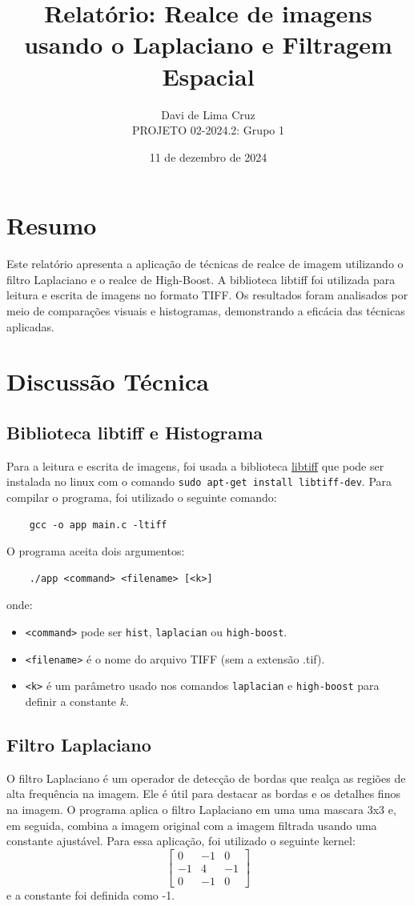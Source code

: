 \documentclass{article}
\author{Davi de Lima Cruz\\  PROJETO 02-2024.2: Grupo 1}
\title{Relatório: Realce de imagens usando o Laplaciano e Filtragem Espacial}
\date{11 de dezembro de 2024}
\begin{document}
\maketitle

\vfill
\section*{Resumo}
Este relatório apresenta a aplicação de técnicas de realce de imagem utilizando o filtro Laplaciano e o realce de High-Boost. A biblioteca libtiff foi utilizada para leitura e escrita de imagens no formato TIFF. Os resultados foram analisados por meio de comparações visuais e histogramas, demonstrando a eficácia das técnicas aplicadas.
\newpage
\section{Discussão Técnica}
\subsection{Biblioteca libtiff e Histograma}
Para a leitura e escrita de imagens, foi usada a biblioteca \href{http://www.simplesystems.org/libtiff/}{libtiff} que pode ser instalada no linux com o comando \texttt{sudo apt-get install libtiff-dev}. 
Para compilar o programa, foi utilizado o seguinte comando:
\begin{lstlisting}
    gcc -o app main.c -ltiff
\end{lstlisting}
O programa aceita dois argumentos: 
\begin{lstlisting}
    ./app <command> <filename> [<k>]
\end{lstlisting}
onde:
\begin{itemize}
    \item \texttt{<command>} pode ser \texttt{hist}, \texttt{laplacian} ou \texttt{high-boost}.
    \item \texttt{<filename>} é o nome do arquivo TIFF (sem a extensão .tif).
    \item \texttt{<k>} é um parâmetro usado nos comandos \texttt{laplacian} e \texttt{high-boost} para definir a constante $k$.
\end{itemize}

\subsection{Filtro Laplaciano}
O filtro Laplaciano é um operador de detecção de bordas que realça as regiões de alta frequência na imagem. Ele é útil para destacar as bordas e os detalhes finos na imagem. O programa aplica o filtro Laplaciano em uma uma mascara 3x3 e, em seguida, combina a imagem original com a imagem filtrada usando uma constante ajustável.
Para essa aplicação, foi utilizado o seguinte kernel:
\[
\begin{bmatrix}
0 & -1 & 0 \\
-1 & 4 & -1 \\
0 & -1 & 0
\end{bmatrix}
\]
e a constante foi definida como -1.
\end{document}

